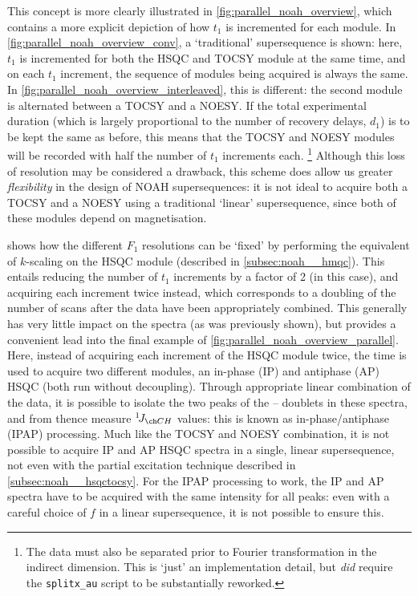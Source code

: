 This concept is more clearly illustrated in \cref{fig:parallel_noah_overview}, which contains a more explicit depiction of how $t_1$ is incremented for each module.
In \cref{fig:parallel_noah_overview_conv}, a `traditional'  supersequence is shown: here, $t_1$ is incremented for both the HSQC and TOCSY module at the same time, and on each $t_1$ increment, the sequence of modules being acquired is always the same.
In \cref{fig:parallel_noah_overview_interleaved}, this is different: the second module is alternated between a TOCSY and a NOESY.
If the total experimental duration (which is largely proportional to the number of recovery delays, $d_1$) is to be kept the same as before, this means that the TOCSY and NOESY modules will be recorded with half the number of $t_1$ increments each.%
\footnote{The data must also be separated prior to Fourier transformation in the indirect dimension. This is `just' an implementation detail, but \textit{did} require the \texttt{splitx\_au} script to be substantially reworked.}
Although this loss of resolution may be considered a drawback, this scheme does allow us greater \textit{flexibility} in the design of NOAH supersequences: it is not ideal to acquire both a TOCSY and a NOESY using a traditional `linear' supersequence, since both of these modules depend on  magnetisation.

 shows how the different $F_1$ resolutions can be `fixed' by performing the equivalent of $k$-scaling on the HSQC module (described in \cref{subsec:noah__hmqc}).
This entails reducing the number of $t_1$ increments by a factor of 2 (in this case), and acquiring each increment twice instead, which corresponds to a doubling of the number of scans after the data have been appropriately combined.
This generally has very little impact on the spectra (as was previously shown), but provides a convenient lead into the final example of \cref{fig:parallel_noah_overview_parallel}.
Here, instead of acquiring each increment of the HSQC module twice, the time is used to acquire two different modules, an in-phase (IP) and antiphase (AP) HSQC (both run without \carbon{} decoupling).
Through appropriate linear combination of the data, it is possible to isolate the two peaks of the \proton{}--\carbon{} doublets in these spectra, and from thence measure $\oneJ{CH}$ values: this is known as in-phase/antiphase (IPAP) processing.\autocite{Ottiger1998JMR,Nolis2006JMR,Enthart2008JMR,Gil2010JMR}
Much like the TOCSY and NOESY combination, it is not possible to acquire IP and AP HSQC spectra in a single, linear supersequence, not even with the partial  excitation technique described in \cref{subsec:noah__hsqctocsy}.
For the IPAP processing to work, the IP and AP spectra have to be acquired with the same intensity for all peaks: even with a careful choice of $f$ in a linear supersequence, it is not possible to ensure this.

